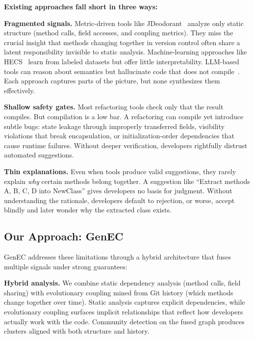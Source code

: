 \documentclass[sigconf]{acmart}
\begin{document}
\textbf{Existing approaches fall short in three ways:}

\textbf{Fragmented signals.}  Metric-driven tools like
JDeodorant~\cite{Fokaefs2011JDeodorant} analyze only static
structure (method calls, field accesses, and coupling metrics). They miss the
crucial insight that methods changing together in version control often share a
latent responsibility invisible to static analysis. Machine-learning approaches
like HECS~\cite{Cui2024HECS} learn from labeled datasets but offer little
interpretability.  LLM-based tools can reason about semantics but hallucinate
code that does not compile~\cite{cassee2024refuctoring, Liu2024Empirical}. Each
approach captures parts of the picture, but none synthesizes them effectively.

\textbf{Shallow safety gates.}  Most refactoring tools check only that the
result compiles. But compilation is a low bar.  A refactoring can compile yet
introduce subtle bugs: state leakage through improperly transferred fields,
visibility violations that break encapsulation, or initialization-order
dependencies that cause runtime failures. Without deeper verification,
developers rightfully distrust automated suggestions.

\textbf{Thin explanations.}  Even when tools produce valid suggestions, they
rarely explain \emph{why} certain methods belong together. A suggestion like
``Extract methods A, B, C, D into NewClass'' gives developers no basis for
judgment. Without understanding the rationale, developers default to
rejection, or worse, accept blindly and later wonder why the extracted class
exists.

\subsection{Our Approach: GenEC}
\label{sec:approach-overview}

GenEC addresses these limitations through a hybrid architecture that fuses
multiple signals under strong guarantees:

\textbf{Hybrid analysis.}  We combine static dependency analysis (method calls,
field sharing) with evolutionary coupling mined from Git history (which methods
change together over time). Static analysis captures explicit dependencies,
while evolutionary coupling surfaces implicit relationships that reflect how
developers actually work with the code. Community detection on the fused graph
produces clusters aligned with both structure and history.
\end{document}
